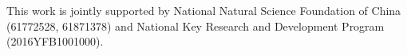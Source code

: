\documentclass[sigconf]{acmart}
\begin{document}
\begin{acks}
This work is jointly supported by National Natural Science Foundation of China (61772528, 61871378) and National Key Research and Development Program (2016YFB1001000).
\end{acks}




 

\balance

\end{document}
